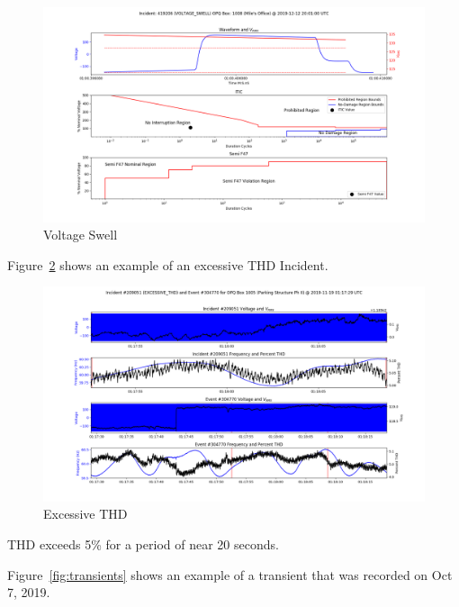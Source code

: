 \begin{figure}[H]
    \centering
    \includegraphics[width=\linewidth]{figures/voltage-incident-419206.png}
    \caption{Voltage Swell}
    \label{fig:vswell}
\end{figure}

Figure~\ref{fig:thd} shows an example of an excessive THD Incident.

\begin{figure}[H]
    \centering
    \includegraphics[width=\linewidth]{figures/thd.png}
    \caption{Excessive THD}
    \label{fig:thd}
\end{figure}

THD exceeds 5\% for a period of near 20 seconds.

Figure~\ref{fig:transients} shows an example of a transient that was recorded on Oct 7, 2019.

